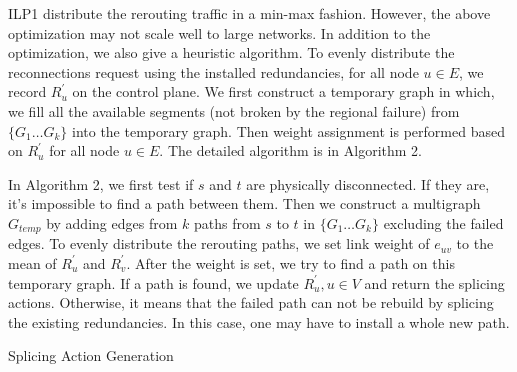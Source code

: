 \documentclass[10pt,journal]{IEEEtran}
\begin{document}
ILP1 distribute the rerouting traffic in a min-max fashion. However, the above optimization may not scale well to large networks. In addition to the optimization, we also give a heuristic algorithm. To evenly distribute the reconnections request using the installed redundancies, for all node $u\in E$, we record $R^{'}_{u}$ on the control plane. We first construct a temporary graph in which, we fill all the available segments (not broken by the regional failure) from $\{G_1 \ldots G_{k}\}$ into the temporary graph. Then weight assignment is performed based on $R^{'}_{u}$ for all node $u\in E$. The detailed algorithm is in Algorithm 2.

In Algorithm 2, we first test if $s$ and $t$ are physically disconnected. If they are, it's impossible to find a path between them. Then we construct a multigraph $G_{temp}$ by adding edges from $k$ paths from $s$ to $t$ in $\{G_1 \ldots G_k\}$ excluding the failed edges. To evenly distribute the rerouting paths, we set link weight of $e_{uv}$ to the mean of $R^{'}_{u}$ and $R^{'}_{v}$. After the weight is set, we try to find a path on this temporary graph. If a path is found, we update $R^{'}_{u}, u\in V$ and return the splicing actions. Otherwise, it means that the failed path can not be rebuild by splicing the existing redundancies. In this case, one may have to install a whole new path.
\begin{algorithm}[!ht]
\caption{Splicing Action Generation}
\label{algo:s_a_g}
\end{algorithm}
\end{document}
